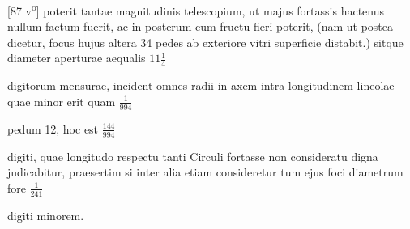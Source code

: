 [87 v\textsuperscript{o}] poterit tantae magnitudinis telescopium\protect{}, ut majus fortassis hactenus nullum factum fuerit, ac in posterum cum fructu fieri poterit, (nam ut postea dicetur, focus hujus altera 34 pedes ab exteriore vitri superficie distabit.) sitque diameter aperturae aequalis $\displaystyle11\frac{1}{4}$\rule[-4mm]{0mm}{10mm} digitorum mensurae, incident omnes radii in axem intra longitudinem lineolae quae minor erit quam $\displaystyle\frac{1}{994}$\rule[-4mm]{0mm}{10mm} pedum 12, hoc est $\displaystyle\frac{144}{994}$\rule[-4mm]{0mm}{10mm} digiti, quae longitudo respectu tanti Circuli fortasse non consideratu digna judicabitur, praesertim si inter alia etiam consideretur tum ejus foci diametrum fore $\displaystyle\frac{1}{241}$\rule[-4mm]{0mm}{10mm} digiti minorem.
\pend 
